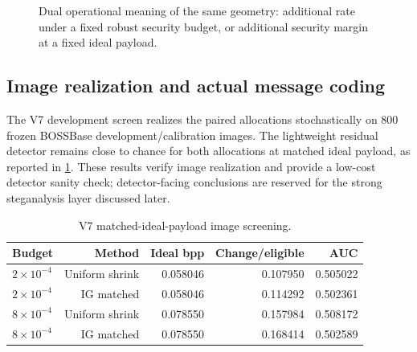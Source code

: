 \documentclass[10pt]{article}
\begin{document}
\begin{figure}[t]
\centering
{}
\caption{Dual operational meaning of the same geometry: additional rate under a fixed robust security budget, or additional security margin at a fixed ideal payload.}
\label{fig:dual-benefit}
\end{figure}

\subsection{Image realization and actual message coding}
The V7 development screen realizes the paired allocations stochastically on 800 frozen BOSSBase development/calibration images. The lightweight residual detector remains close to chance for both allocations at matched ideal payload, as reported in \cref{tab:operational}. These results verify image realization and provide a low-cost detector sanity check; detector-facing conclusions are reserved for the strong steganalysis layer discussed later.

\begin{table}[t]
\centering
\caption{V7 matched-ideal-payload image screening.}
\label{tab:operational}
\small
\begin{tabular}{@{}lrrrr@{}}
\toprule
Budget & Method & Ideal bpp & Change/eligible & AUC\\
\midrule
\(2\times10^{-4}\) & Uniform shrink & 0.058046 & 0.107950 & 0.505022\\
\(2\times10^{-4}\) & IG matched & 0.058046 & 0.114292 & 0.502361\\
\(8\times10^{-4}\) & Uniform shrink & 0.078550 & 0.157984 & 0.508172\\
\(8\times10^{-4}\) & IG matched & 0.078550 & 0.168414 & 0.502589\\
\bottomrule
\end{tabular}
\end{table}
\end{document}
